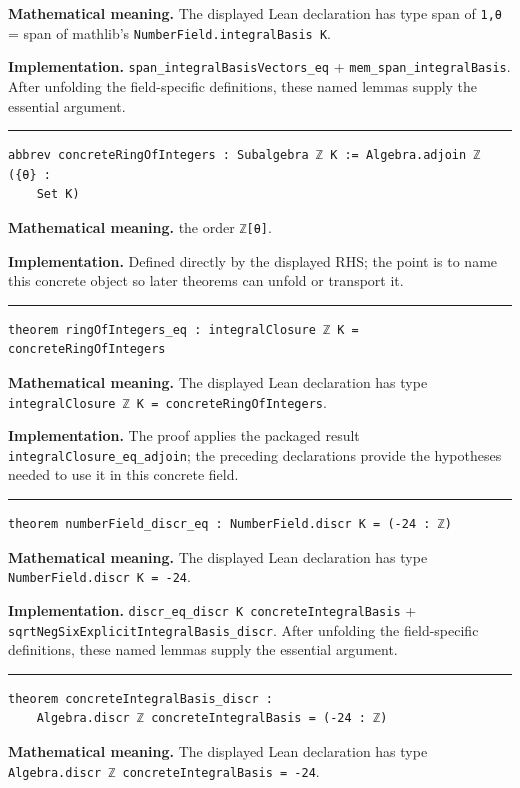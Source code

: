 \documentclass[UTF8,a4paper,11pt,fontset=fandol]{ctexart}
\theoremstyle{definition}
\newcommand{\statementsep}{\par\medskip\hrule\medskip}
\begin{document}
\noindent\textbf{Mathematical meaning.} The displayed Lean declaration has type span of \texttt{1,θ} = span of mathlib's \texttt{NumberField.\allowbreak{}integralBasis K}.\par
\noindent\textbf{Implementation.} \texttt{span\_\allowbreak{}integralBasisVectors\_\allowbreak{}eq} + \texttt{mem\_\allowbreak{}span\_\allowbreak{}integralBasis}. After unfolding the field-specific definitions, these named lemmas supply the essential argument.\par
\statementsep
\begin{verbatim}
abbrev concreteRingOfIntegers : Subalgebra ℤ K := Algebra.adjoin ℤ ({θ} :
    Set K)
\end{verbatim}
\noindent\textbf{Mathematical meaning.} the order \texttt{ℤ[θ]}.\par
\noindent\textbf{Implementation.} Defined directly by the displayed RHS; the point is to name this concrete object so later theorems can unfold or transport it.\par
\statementsep
\begin{verbatim}
theorem ringOfIntegers_eq : integralClosure ℤ K = concreteRingOfIntegers
\end{verbatim}
\noindent\textbf{Mathematical meaning.} The displayed Lean declaration has type \texttt{integralClosure ℤ K = concreteRingOfIntegers}.\par
\noindent\textbf{Implementation.} The proof applies the packaged result \texttt{integralClosure\_\allowbreak{}eq\_\allowbreak{}adjoin}; the preceding declarations provide the hypotheses needed to use it in this concrete field.\par
\statementsep
\begin{verbatim}
theorem numberField_discr_eq : NumberField.discr K = (-24 : ℤ)
\end{verbatim}
\noindent\textbf{Mathematical meaning.} The displayed Lean declaration has type \texttt{NumberField.\allowbreak{}discr K = -24}.\par
\noindent\textbf{Implementation.} \texttt{discr\_\allowbreak{}eq\_\allowbreak{}discr K concreteIntegralBasis} + \texttt{sqrtNegSixExplicitIntegralBasis\_\allowbreak{}discr}. After unfolding the field-specific definitions, these named lemmas supply the essential argument.\par
\statementsep
\begin{verbatim}
theorem concreteIntegralBasis_discr :
    Algebra.discr ℤ concreteIntegralBasis = (-24 : ℤ)
\end{verbatim}
\noindent\textbf{Mathematical meaning.} The displayed Lean declaration has type \texttt{Algebra.\allowbreak{}discr ℤ concreteIntegralBasis = -24}.\par
\end{document}
